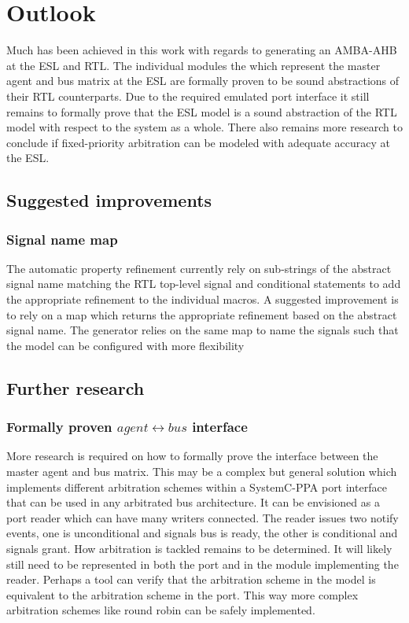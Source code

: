 \section{Outlook}
\label{sec:outl}
Much has been achieved in this work with regards to generating an AMBA-AHB at the ESL and RTL. The individual modules the which represent the master agent and bus matrix at the ESL are formally proven to be sound abstractions of their RTL counterparts. Due to the required emulated port interface it still remains to formally prove that the ESL model is a sound abstraction of the RTL model with respect to the system as a whole. There also remains more research to conclude if fixed-priority arbitration can be modeled with adequate accuracy at the ESL.   

\subsection{Suggested improvements}
\label{sec:impr}
\subsubsection{Signal name map}
The automatic property refinement currently rely on sub-strings of the abstract signal name matching the RTL top-level signal and conditional statements to add the appropriate refinement to the individual macros. A suggested improvement is to rely on a map which returns the appropriate refinement based on the abstract signal name. The generator relies on the same map to name the signals such that the model can be configured with more flexibility


\subsection{Further research}
\subsubsection{Formally proven $agent\leftrightarrow bus$ interface}
More research is required on how to formally prove the interface between the master agent and bus matrix. This may be a complex but general solution which implements different arbitration schemes within a SystemC-PPA port interface that can be used in any arbitrated bus architecture. It can be envisioned as a port reader which can have many writers connected. The reader issues two notify events, one is unconditional and signals bus is ready, the other is conditional and signals grant. How arbitration is tackled remains to be determined. It will likely still need to be represented in both the port and in the module implementing the reader. Perhaps a tool can verify that the arbitration scheme in the model is equivalent to the arbitration scheme in the port. This way more complex arbitration schemes like round robin can be safely implemented.  

